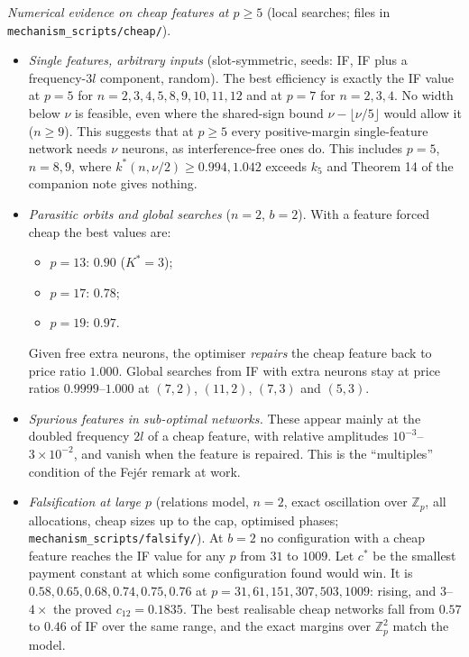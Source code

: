 \documentclass[11pt]{article}
\theoremstyle{definition}
\begin{document}
\emph{Numerical evidence on cheap features at $p\ge5$} (local searches; files in
\texttt{mechanism\_scripts/cheap/}).
\begin{itemize}
\item \emph{Single features, arbitrary inputs} (slot-symmetric, seeds: IF, IF plus a frequency-$3l$ component, random).
The best efficiency is exactly the IF value at $p=5$ for $n=2,3,4,5,8,9,10,11,12$ and at $p=7$ for $n=2,3,4$.  No width below $\nu$ is
feasible, even where the shared-sign bound $\nu-\lfloor\nu/5\rfloor$ would allow it ($n\ge9$).  This suggests that at $p\ge5$ every positive-margin
single-feature network needs $\nu$ neurons, as interference-free ones do.  This includes $p=5$, $n=8,9$, where $k^*(n,\nu/2)\ge0.994,1.042$ exceeds $k_5$ and Theorem 14 of the companion note gives nothing.
\item \emph{Parasitic orbits and global searches} ($n=2$, $b=2$).  With a feature forced cheap the best values are:
\begin{itemize}
\item $p=13$: $0.90$ ($K^*=3$);
\item $p=17$: $0.78$;
\item $p=19$: $0.97$.
\end{itemize}
Given free extra neurons, the optimiser \emph{repairs} the cheap feature back to price ratio $1.000$.  Global searches from IF
with extra neurons stay at price ratios $0.9999$--$1.000$ at $(7,2)$, $(11,2)$, $(7,3)$ and $(5,3)$.
\item \emph{Spurious features in sub-optimal networks.}  These appear mainly at the doubled frequency $2l$ of a cheap feature,
with relative amplitudes $10^{-3}$--$3\times10^{-2}$, and vanish when the feature is repaired.  This is the ``multiples'' condition of the Fej\'er
remark at work.
\item \emph{Falsification at large $p$} (relations model, $n=2$, exact oscillation over $\mathbb Z_p$, all allocations, cheap sizes up to the cap, optimised phases;
\texttt{mechanism\_scripts/falsify/}).  At $b=2$ no configuration with a cheap feature reaches the IF value for any $p$ from $31$ to $1009$.  Let $c^*$ be the smallest
payment constant at which some configuration found would win.  It is $0.58,0.65,0.68,0.74,0.75,0.76$ at $p=31,61,151,307,503,1009$: rising, and $3$--$4\times$ the proved
$c_{12}=0.1835$.  The best realisable cheap networks fall from $0.57$ to $0.46$ of IF over the same range, and the exact margins over $\mathbb Z_p^2$ match the model.
\begin{itemize}

\end{itemize}
\end{itemize}
\end{document}
